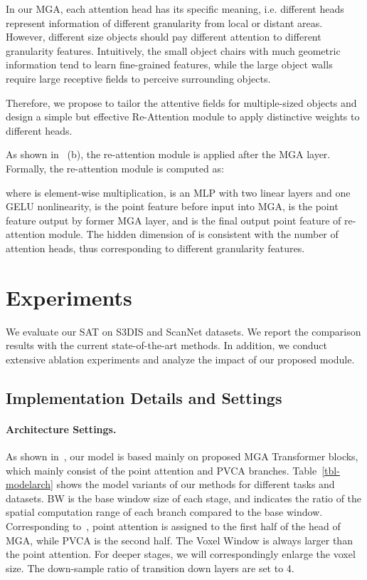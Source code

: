 \documentclass[10pt,twocolumn,letterpaper]{article}
\begin{document}
In our MGA, each attention head has its specific meaning, i.e. different heads represent information of different granularity from local or distant areas. However, different size objects should pay different attention to different granularity features. Intuitively, the small object chairs with much geometric information tend to learn fine-grained features, while the large object walls require large receptive fields to perceive surrounding objects.


Therefore, we propose to tailor the attentive fields for multiple-sized objects and design a simple but effective Re-Attention module to apply distinctive weights to different heads.

As shown in~ (b), the re-attention module is applied after the MGA layer. Formally, the re-attention module is computed as:

where  is element-wise multiplication,  is an MLP with two linear layers and one GELU nonlinearity,  is the point feature before input into MGA,  is the point feature output by former MGA layer, and  is the final output point feature of re-attention module. The hidden dimension of  is consistent with the number of attention heads, thus corresponding to different granularity features.






\section{Experiments}\label{Sec-Exp}
We evaluate our SAT on S3DIS\cite{datasets3dis} and ScanNet\cite{datasetscannet} datasets. We report the comparison results with the current state-of-the-art methods. In addition, we conduct extensive ablation experiments and analyze the impact of our proposed module.

\subsection{Implementation Details and Settings}\label{sec-4.1}
\paragraph{Architecture Settings.} As shown in~, our model is based mainly on proposed MGA Transformer blocks, which mainly consist of the point attention and PVCA branches. Table~\ref{tbl-modelarch} shows the model variants of our methods for different tasks and datasets. BW is the base window size of each stage, and  indicates the ratio of the spatial computation range of each branch compared to the base window. Corresponding to~, point attention is assigned to the first half of the head of MGA, while PVCA is the second half. The Voxel Window is always larger than the point attention. For deeper stages, we will correspondingly enlarge the voxel size. The down-sample ratio of transition down layers are set to 4.
\end{document}
